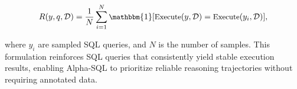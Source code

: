 \begin{equation*}\vspace*{-1em} \small 
R(y, q, \mathcal{D}) = \frac{1}{N} \sum_{i=1}^N \mathbbm{1}[\text{Execute}(y, \mathcal{D}) = \text{Execute}(y_i, \mathcal{D})], \end{equation*}

where $y_i$ are sampled SQL queries, and $N$ is the number of samples. 
This formulation reinforces SQL queries that consistently yield stable execution results, enabling Alpha-SQL to prioritize reliable reasoning trajectories without requiring annotated data.
% 


	

